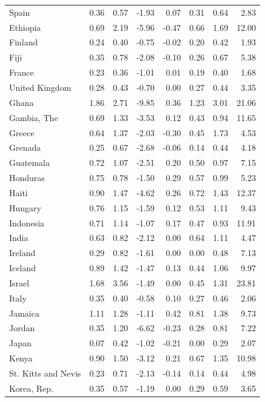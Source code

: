 \begin{tabular}{lrrrrrrr}
Spain & 0.36 & 0.57 & -1.93 & 0.07 & 0.31 & 0.64 & 2.83 \\
Ethiopia & 0.69 & 2.19 & -5.96 & -0.47 & 0.66 & 1.69 & 12.00 \\
Finland & 0.24 & 0.40 & -0.75 & -0.02 & 0.20 & 0.42 & 1.93 \\
Fiji & 0.35 & 0.78 & -2.08 & -0.10 & 0.26 & 0.67 & 5.38 \\
France & 0.23 & 0.36 & -1.01 & 0.01 & 0.19 & 0.40 & 1.68 \\
United Kingdom & 0.28 & 0.43 & -0.70 & 0.00 & 0.27 & 0.44 & 3.35 \\
Ghana & 1.86 & 2.71 & -9.85 & 0.36 & 1.23 & 3.01 & 21.06 \\
Gambia, The & 0.69 & 1.33 & -3.53 & 0.12 & 0.43 & 0.94 & 11.65 \\
Greece & 0.64 & 1.37 & -2.03 & -0.30 & 0.45 & 1.73 & 4.53 \\
Grenada & 0.25 & 0.67 & -2.68 & -0.06 & 0.14 & 0.44 & 4.18 \\
Guatemala & 0.72 & 1.07 & -2.51 & 0.20 & 0.50 & 0.97 & 7.15 \\
Honduras & 0.75 & 0.78 & -1.50 & 0.29 & 0.57 & 0.99 & 5.23 \\
Haiti & 0.90 & 1.47 & -4.62 & 0.26 & 0.72 & 1.43 & 12.37 \\
Hungary & 0.76 & 1.15 & -1.59 & 0.12 & 0.53 & 1.11 & 9.43 \\
Indonesia & 0.71 & 1.14 & -1.07 & 0.17 & 0.47 & 0.93 & 11.91 \\
India & 0.63 & 0.82 & -2.12 & 0.00 & 0.64 & 1.11 & 4.47 \\
Ireland & 0.29 & 0.82 & -1.61 & 0.00 & 0.00 & 0.48 & 7.13 \\
Iceland & 0.89 & 1.42 & -1.47 & 0.13 & 0.44 & 1.06 & 9.97 \\
Israel & 1.68 & 3.56 & -1.49 & 0.00 & 0.45 & 1.31 & 23.81 \\
Italy & 0.35 & 0.40 & -0.58 & 0.10 & 0.27 & 0.46 & 2.06 \\
Jamaica & 1.11 & 1.28 & -1.11 & 0.42 & 0.81 & 1.38 & 9.73 \\
Jordan & 0.35 & 1.20 & -6.62 & -0.23 & 0.28 & 0.81 & 7.22 \\
Japan & 0.07 & 0.42 & -1.02 & -0.21 & 0.00 & 0.29 & 2.07 \\
Kenya & 0.90 & 1.50 & -3.12 & 0.21 & 0.67 & 1.35 & 10.98 \\
St. Kitts and Nevis & 0.23 & 0.71 & -2.13 & -0.14 & 0.14 & 0.44 & 4.98 \\
Korea, Rep. & 0.35 & 0.57 & -1.19 & 0.00 & 0.29 & 0.59 & 3.65 \\

\end{tabular}

